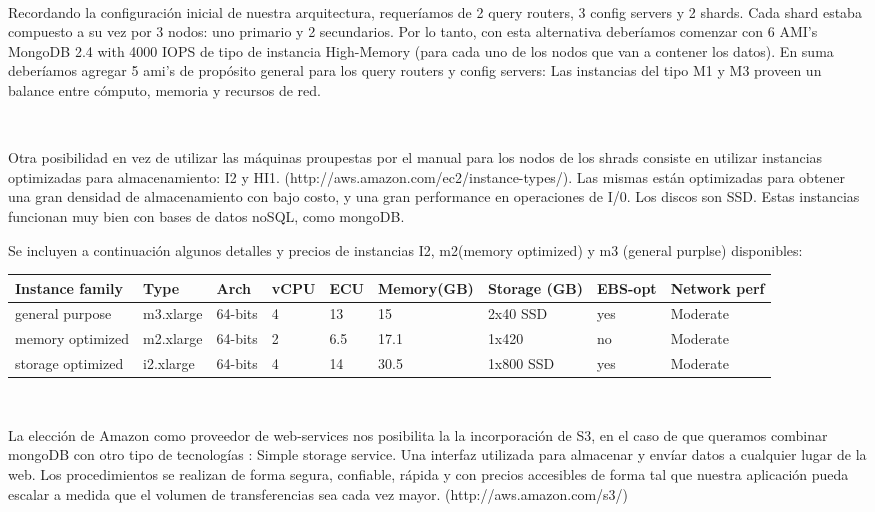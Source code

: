 ~

Recordando la configuración inicial de nuestra arquitectura, requeríamos de 2 query routers, 3 config servers y 2 shards.
Cada shard estaba compuesto a su vez por 3 nodos: uno primario y 2 secundarios. 
Por lo tanto, con esta alternativa deberíamos comenzar con 6 AMI's MongoDB 2.4 with 4000 IOPS de tipo de instancia
High-Memory (para cada uno de los nodos que van a contener los datos). En suma deberíamos agregar 5 ami's de propósito
general para los query routers y config servers: Las instancias del tipo M1 y M3 proveen un balance entre cómputo, 
memoria y recursos de red.

~

Otra posibilidad en vez de utilizar las máquinas proupestas por el manual para los nodos de los shrads
consiste en utilizar instancias
optimizadas para almacenamiento: I2 y HI1. (http://aws.amazon.com/ec2/instance-types/). Las mismas están optimizadas
para obtener una gran densidad de almacenamiento con bajo costo, y una gran performance en operaciones de I/0.
Los discos son SSD.
Estas instancias funcionan muy bien con bases de datos noSQL, como mongoDB.

Se incluyen a continuación algunos detalles y precios de instancias I2, m2(memory optimized)
y m3 (general purplse) disponibles:

\begin{center}
    \small{
    \begin{tabular}{| l | l | l | l | l | l | l | l | l |}
    \hline
    Instance family & Type & Arch & vCPU & ECU & Memory(GB) & Storage (GB) & EBS-opt & Network perf\\ \hline
    general purpose & m3.xlarge & 64-bits & 4 & 13 & 15 & 2x40 SSD & yes & Moderate \\ \hline
    memory optimized & m2.xlarge & 64-bits & 2 & 6.5 & 17.1 & 1x420 & no & Moderate \\ \hline 
    storage optimized & i2.xlarge & 64-bits & 4 & 14 & 30.5 & 1x800 SSD & yes & Moderate  \\ \hline
    \end{tabular}
    }
\end{center}

~

La elección de Amazon como proveedor de web-services nos posibilita la 
la incorporación de S3, en el caso de que queramos combinar mongoDB con otro tipo de tecnologías
: Simple storage service. Una interfaz
utilizada para almacenar y envíar datos a cualquier lugar de la web. Los procedimientos se realizan de forma segura,
confiable, rápida y con precios accesibles de forma tal que nuestra aplicación pueda escalar a medida que el volumen
de transferencias sea cada vez mayor. (http://aws.amazon.com/s3/)

